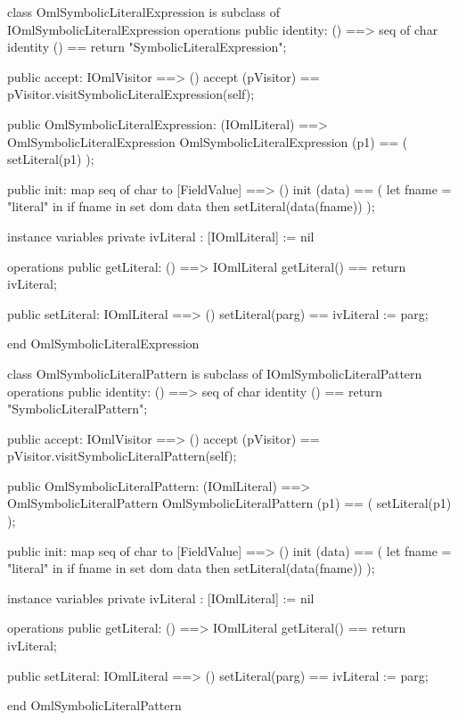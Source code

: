 \begin{vdm_al}
class OmlSymbolicLiteralExpression is subclass of IOmlSymbolicLiteralExpression
operations
  public identity: () ==> seq of char
  identity () == return "SymbolicLiteralExpression";

  public accept: IOmlVisitor ==> ()
  accept (pVisitor) == pVisitor.visitSymbolicLiteralExpression(self);

  public OmlSymbolicLiteralExpression:
      (IOmlLiteral) ==> OmlSymbolicLiteralExpression
  OmlSymbolicLiteralExpression (p1) == 
   ( setLiteral(p1) );

  public init: map seq of char to [FieldValue] ==> ()
  init (data) ==
    ( let fname = "literal" in
        if fname in set dom data
        then setLiteral(data(fname)) );

instance variables
  private ivLiteral : [IOmlLiteral] := nil

operations
  public getLiteral: () ==> IOmlLiteral
  getLiteral() == return ivLiteral;

  public setLiteral: IOmlLiteral ==> ()
  setLiteral(parg) == ivLiteral := parg;

end OmlSymbolicLiteralExpression
\end{vdm_al}

\begin{vdm_al}
class OmlSymbolicLiteralPattern is subclass of IOmlSymbolicLiteralPattern
operations
  public identity: () ==> seq of char
  identity () == return "SymbolicLiteralPattern";

  public accept: IOmlVisitor ==> ()
  accept (pVisitor) == pVisitor.visitSymbolicLiteralPattern(self);

  public OmlSymbolicLiteralPattern:
      (IOmlLiteral) ==> OmlSymbolicLiteralPattern
  OmlSymbolicLiteralPattern (p1) == 
   ( setLiteral(p1) );

  public init: map seq of char to [FieldValue] ==> ()
  init (data) ==
    ( let fname = "literal" in
        if fname in set dom data
        then setLiteral(data(fname)) );

instance variables
  private ivLiteral : [IOmlLiteral] := nil

operations
  public getLiteral: () ==> IOmlLiteral
  getLiteral() == return ivLiteral;

  public setLiteral: IOmlLiteral ==> ()
  setLiteral(parg) == ivLiteral := parg;

end OmlSymbolicLiteralPattern
\end{vdm_al}

